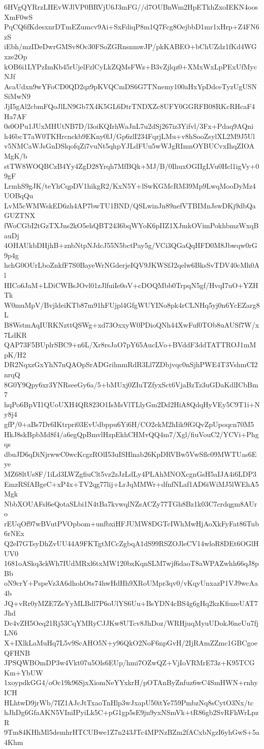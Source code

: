 6HVgQYRrzLHEvWJlVP0BRVjU6J3mFG//d7OUBnWm2HpETkhZxoIEKN4oosXmF0wS
PqCQ6fKdesxnrDTmEZumcv9Ai+SxFdiqP8m1Q7Fcg8OejbbD1mr1xHrp+Z4FN6zS
iEbh/mzIDeDwrGMSv8Oc30FSoZGRnsnmwJP/pkKABEO+bChUZdz1fKd4WGxze2Op
kOB6i1LYPzImKb45rUjelFzlCyLkZQMsFWz+B3vZjlqz0+XMxWxLpPExUfMycNJf
AcaUdxn9wYFoCD0QD2qz9pKVQCmDS6G7TNnemy100aHxYpDdceTyzUgUSNSiMwN9
JjI5gAl2cbmFQoJlLN9Gb7X4K5GL6DtrTNDXZc8UFY0GGRFB08RKcRHcaF4Ha7AF
0s0OPu1JUxMHUtNB7D/l3oiKQIrhWaJnL7u2dSj267iz3Yifvl/3Fx+Pdaq9AQni
h46bcT7aW0TKHrcnckb9EKny0lJ/Gp6zlI234FqrjLMu+v8hSooZsylXL2M9J5Ul
v5NMCaWJsGnDSlqofqZi7vuNt5qhpYJLdFUu5wWJgRImnOYBUCvxIhqZIOAMgK/b
stTW8WOQBCzB4Yy4ZgD28Yrqh7MfBQk+MJ/B/0IhuxOGIIgLVu0Hcl1igVy+09gF
LrmhS9gJK/teYhCqpDV1hikgR2/KxN5Y+lSwKGMcRM39Mp9LwqMooDyMz4UOBqQu
LvM5cWMWskED6zh4AP7bwTU1BND/QSLwinJn89nefVTBIMnJswDKj9dbQaGUZTNX
fWoCGbI2tGzTXJns2kO5ehQBT2436bqWYoK6pIIZ1XJmkOVimPokhbmzWxqBauDj
4OHAUkbDHjhB+znbNtpNJdcJ55N5bctPay5g/VCi3QGaQqHFD0M8Jbwqw0rG9p4g
hchG0OUrLboZnkfF7S0BayeWrNGderjeIQV9JKWSfJ2qelw6BksSvTDV40cMh0Al
HICo6JaM+LDiCWBsJOvl01zJlfuiIe0oV+cDOQMbb0TrpqN5gf/HvqI7uO+YZHTk
W0muMpV/BvjldeiKTb87m91hFUjpl4GfgWUYINo8pk4rCLNHq5yj0n6YcEZarg8L
B8WstmAqIURKNzttQSWg+xd73OxxyW0PDioQNh44XwFuf0TOb8uAUSf7W/x7LdKR
QAP73F5BUplrSBC9+n6L/Xr8rsJaO7pY65AucLVo+BVddF3ddTATTROJ1mMpK/H2
DR2NqxzGxYhN7nQAOpSrADGrihnmRdR3Ll7ZDbjvqc0nSjhPWE4T3VshmCI2nrqQ
8G0Y9Qpy6xr3YNRseeGy6a/5+bMUxj0ZIuTZfyxSct6VjaBzTz3uGDaKdlICbBm7
hqPo6BpVI1QUoUXH4QR823O1IsMsVlTLlyGm2Dd2HiA8QdqHyVEy5C9T1i+Ny8j4
gfP/0+aBs7Dr6IKtrpri03EvUdbppu6Yi6H/CO2ekM2hIik9fGQvZpUpoqcn70M5
HkJ8skBpbMd8f4/a6egQpBmvlHzpEkhCHMvQQ4m7/Xgl/fiuVouC2/YCVi+Phgqs
dbuJD6qDiNjrwwC0wcKcgzROlI53uISHlnab26KpDRVBw5VwSflc09MWTUas6Eye
MZ68ltUs8F/1iLd3LWZgfiuClt5vz2zJzLdLy4PLAhMNOXcgnGsH5aIJA4i6LDP3
EmzRSfABgeC+xP4x+TV2qg77lij+LrJqMMWr+dfnfNLaf1AD6iWiMJ5lWEhA5Mgk
NbbXOUAFsl6eQotaSLbi1N4tBa7kvwqlNZsACZy77TGh8Bz1k03C7crdqgm8AUro
rEUqOf97wBVutPVOpbom+unfbxiHFJUMW8DGTcIWhMwHjAoXkFyFat86Tub6rNEx
Q2eI7GTsyDhZvUU44A9FKTgtMCcZgbqA1dS99RSZOJleCV14wloR8DEt6OGlHUV0
1681oASkq3ckWh7IUdMRxl6txMW120bxKqnSLM7wjf6daoT8aWPAZwhh66qJ8pBb
oN9crY+PspeVz3A6dhohOts74hwHdHh9XRoUMpr3qv0/vKqyUnxazP1VJ9wcAa4b
JQ+vRr0yMZE7ZeYyMLBdl7P6oUlYS6Uu+BsYDN4cBS4g6gHq2kzKfiuzeUAT7Jhd
Dc4vZH5Oeq21Rj53CqYMRyCJJKw8UTcv8JhDoz/WRHjuqMyuUDokJ6neUu7fjLN6
X+IXlkLaMuHq7L5v9ScAHO5N+y96QkO2NoF6npGvH/2IjRAmZZmc1GBCgoeQFHNB
JPSQWBOmDP3w4Vkt07u5Ols6EUp/hmi7OZwQZ+VjIoVRMrE73z+K95TCGKm+YbUW
1xoypdkGG4/oOc19k96SjxXiomNeYYxkrH/pOTAnByZnfuz6wC4SmHWN+rnhyICH
HLhtwD9jrWb/7IZ1AJcJtTxaoTnHlp3wJxapU50itYe759PmbzNq8sCytO3Nx/tc
hJhDg6GfaAKN5VIniIPyiLk5C+pG1gp5sE9jn9yxNSmVk+tR86gb2SvRFhWrLpzR
9Tm84KHhMl5demhrHTCUBwe1Z7n243JTc4MPNzBZm2fACxbNgzI6yhGwS+5a4Khm
